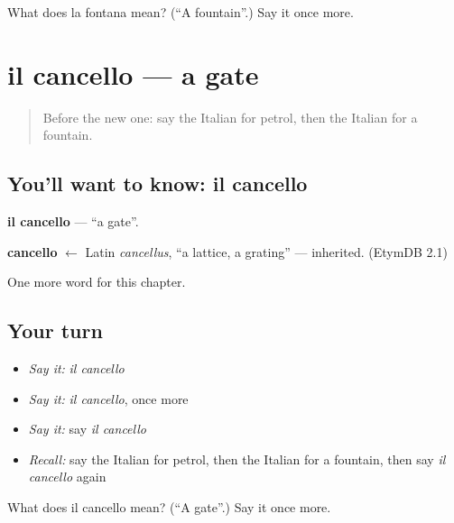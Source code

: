 \begin{tcolorbox}[breakable,colback=teal!4,colframe=teal!35!black,title={Before you move on}]
What does la fontana mean? (\textquotedblleft{}A fountain\textquotedblright{}.) Say it once more.
\end{tcolorbox}
\section[il cancello]{il cancello — a gate}

\label{lesson:IT-C255-cancello}



\begin{quote}
Before the new one: say the Italian for petrol, then the Italian for a fountain.
\end{quote}

\subsection*{You'll want to know: il cancello}
\textbf{il cancello} — \textquotedblleft{}a gate\textquotedblright{}.

\begin{cousinweb}
\textbf{cancello} $\leftarrow$ Latin \emph{cancellus}, \textquotedblleft{}a lattice, a grating\textquotedblright{} — inherited. (EtymDB 2.1)
\end{cousinweb}

\begin{grammarlens}[title={What you've built}]
One more word for this chapter.
\end{grammarlens}

\subsection*{Your turn}
\begin{itemize}
\raggedright
  \item \emph{Say it:} \emph{il cancello}
  \item \emph{Say it:} \emph{il cancello}, once more
  \item \emph{Say it:} say \emph{il cancello}
  \item \emph{Recall:} say the Italian for petrol, then the Italian for a fountain, then say \emph{il cancello} again
\end{itemize}

\begin{tcolorbox}[breakable,colback=teal!4,colframe=teal!35!black,title={Before you move on}]
What does il cancello mean? (\textquotedblleft{}A gate\textquotedblright{}.) Say it once more.
\end{tcolorbox}
